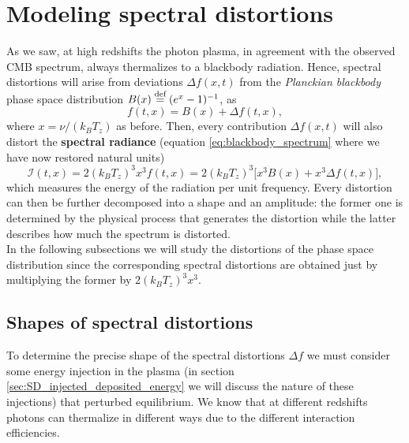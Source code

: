 \section{Modeling spectral distortions}
As we saw, at high redshifts the photon plasma, in agreement with the observed CMB spectrum, always thermalizes to a blackbody radiation. Hence, spectral distortions will arise from deviations $\Delta f(x,t)$ from the \emph{Planckian blackbody} phase space distribution $B(x)\stackrel{\text{def}}{=}(e^x-1)^{-1}$, as$$f(t,x)=B(x)+\Delta f(t,x),$$ where $x=\nu/(k_BT_z)$ as before. Then, every contribution $\Delta f(x,t)$ will also distort the \textbf{spectral radiance} (equation \eqref{eq:blackbody_spectrum} where we have now restored natural units) $$\mathcal{I}(t,x)=2(k_BT_z)^3 x^3f(t,x)=2(k_BT_z)^3\big[x^3B(x)+x^3\Delta f(t,x)\big],$$ which measures the energy of the radiation per unit frequency. Every distortion can then be further decomposed into a shape and an amplitude: the former one is determined by the physical process that generates the distortion while the latter describes how much the spectrum is distorted.\\
In the following subsections we will study the distortions of the phase space distribution since the corresponding spectral distortions are obtained just by multiplying the former by $2(k_BT_z)^3x^3$.

\subsection{Shapes of spectral distortions}\label{sec:SD_shapes}
To determine the precise shape of the spectral distortions $\Delta f$ we must consider some energy injection in the plasma (in section \ref{sec:SD_injected_deposited_energy} we will discuss the nature of these injections) that perturbed equilibrium. We know that at different redshifts photons can thermalize in different ways due to the different interaction efficiencies. 
